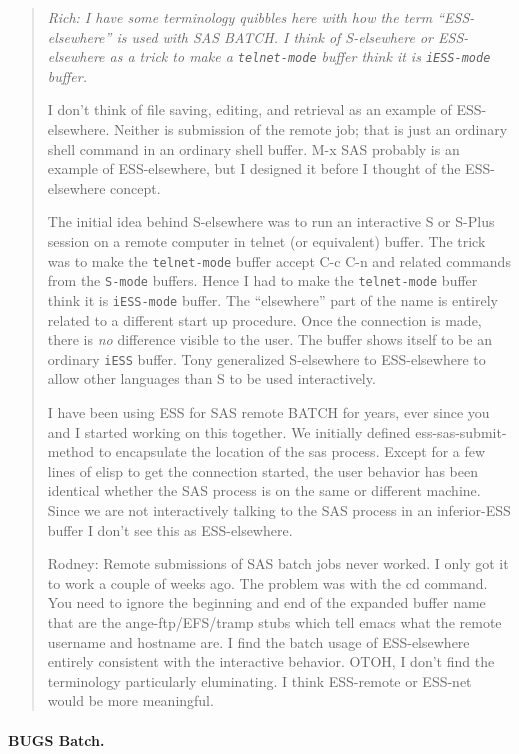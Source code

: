 \documentclass{article}
\newcommand{\stexttt}[1]{{\small\texttt{#1}}}
\newenvironment{Comment}{\begin{quote}\small\itshape }{\end{quote}}
\begin{document}
\begin{Comment}
Rich: I have some terminology quibbles here with how the term
``ESS-elsewhere'' is used with SAS BATCH.  I think of S-elsewhere or
ESS-elsewhere as a trick to make a \stexttt{telnet-mode} buffer think
it is \stexttt{iESS-mode} buffer.

I don't think of file saving, editing, and retrieval as an example
of ESS-elsewhere.   Neither is submission of the remote job;
that is just an ordinary shell command in an ordinary shell buffer.
M-x SAS probably is an example of ESS-elsewhere, but I
designed it before I thought of the ESS-elsewhere concept.

The initial idea behind S-elsewhere was to run an interactive S or S-Plus
session on a remote computer in telnet (or equivalent) buffer.  The trick
was to make the \stexttt{telnet-mode} buffer accept C-c C-n and
related commands from the \stexttt{S-mode} buffers.  Hence I had to
make the \stexttt{telnet-mode} buffer think it is \stexttt{iESS-mode}
buffer.  The ``elsewhere'' part of the name is entirely related to a
different start up procedure.  Once the connection is made, there is
{\em no} difference visible to the user.  The buffer shows itself to
be an ordinary \stexttt{iESS} buffer.  Tony generalized S-elsewhere
to ESS-elsewhere to allow other languages than S to be used
interactively.

I have been using ESS for SAS remote BATCH for years, ever since you
and I started working on this together.  We initially defined
ess-sas-submit-method to encapsulate the location of the sas process.
Except for a few lines of elisp to get the connection started, the user
behavior has been identical whether the SAS process is on the same or
different machine.  Since we are not interactively talking to the SAS
process in an inferior-ESS buffer I don't see this as ESS-elsewhere.

Rodney: Remote submissions of SAS batch jobs never worked.  I only got
it to work a couple of weeks ago.  The problem was with the cd command.
You need to ignore the beginning and end of the expanded buffer name
that are the ange-ftp/EFS/tramp stubs which tell emacs what the remote
username and hostname are.  I find the batch usage of ESS-elsewhere
entirely consistent with the interactive behavior.  OTOH, I don't find 
the terminology particularly eluminating.  I think ESS-remote or 
ESS-net would be more meaningful. 
\end{Comment}
 
\paragraph{BUGS Batch.}
\label{sec:bugs-batch}
  
\end{document}
